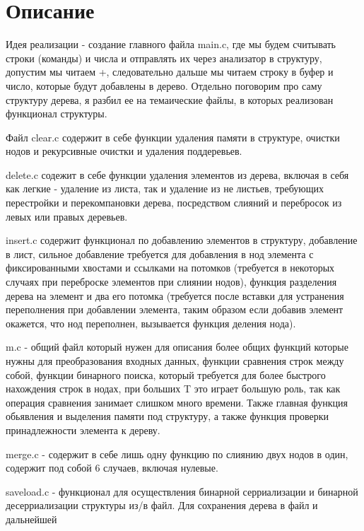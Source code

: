 \section{Описание}

Идея реализации - создание главного файла main.c, где мы будем считывать строки (команды) и числа и отправлять их через анализатор в структуру, допустим мы читаем +, следовательно дальше мы читаем строку в буфер и число, которые будут добавлены в дерево. Отдельно поговорим про саму структуру дерева, я разбил ее на темаические файлы, в которых реализован функционал структуры. 

Файл clear.c содержит в себе функции удаления памяти в структуре, очистки нодов и рекурсивные очистки и удаления поддеревьев. 

delete.c содежит в себе функции удаления элементов из дерева, включая в себя как легкие - удаление из листа, так и удаление из не листьев, требующих перестройки и перекомпановки дерева, посредством слияний и перебросок из левых или правых деревьев.

insert.c содержит функционал по добавлению элементов в структуру, добавление в лист, сильное добавление требуется для добавления в нод элемента с фиксированными хвостами и ссылками на потомков (требуется в некоторых случаях при переброске элементов при слиянии нодов), функция разделения дерева на элемент и два его потомка (требуется после вставки для устранения переполнения при добавлении элемента, таким образом если добавив элемент окажется, что нод переполнен, вызывается функция деления нода).

m.c - общий файл который нужен для описания более общих функций которые нужны для преобразования входных данных, функции сравнения строк между собой, функции бинарного поиска, который требуется для более быстрого нахождения строк в нодах, при больших T это играет большую роль, так как операция сравнения занимает слишком много времени. Также главная функция обьявления и выделения памяти под структуру, а также функция проверки принадлежности элемента к дереву.

merge.c - содержит в себе лишь одну функцию по слиянию двух нодов в один, содержит под собой 6 случаев, включая нулевые.

saveload.c - функционал для осуществления бинарной серриализации и бинарной десерриализации структуры из/в файл. Для сохранения дерева в файл и дальнейшей 

\pagebreak

